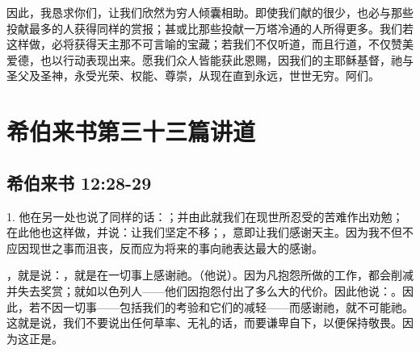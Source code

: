 因此，我恳求你们，让我们欣然为穷人倾囊相助。即使我们献的很少，也必与那些投献最多的人获得同样的赏报；甚或比那些投献一万塔冷通的人所得更多。我们若这样做，必将获得天主那不可言喻的宝藏；若我们不仅听道，而且行道，不仅赞美爱德，也以行动表现出来。愿我们众人皆能获此恩赐，因我们的主耶稣基督，祂与圣父及圣神，永受光荣、权能、尊崇，从现在直到永远，世世无穷。阿们。\par



\section{希伯来书第三十三篇讲道}


\subsection{希伯来书 12:28-29}

\par

1. 他在另一处也说了同样的话：；并由此就我们在现世所忍受的苦难作出劝勉；在此他也这样做，并说：让我们坚定不移；，意即让我们感谢天主。因为我不但不应因现世之事而沮丧，反而应为将来的事向祂表达最大的感谢。\par

，就是说：，就是在一切事上感谢祂。（他说）。因为凡抱怨所做的工作，都会削减并失去奖赏；就如以色列人——他们因抱怨付出了多么大的代价。因此他说：。因此，若不因一切事——包括我们的考验和它们的减轻——而感谢祂，就不可能祂。这就是说，我们不要说出任何草率、无礼的话，而要谦卑自下，以便保持敬畏。因为这正是。\par


